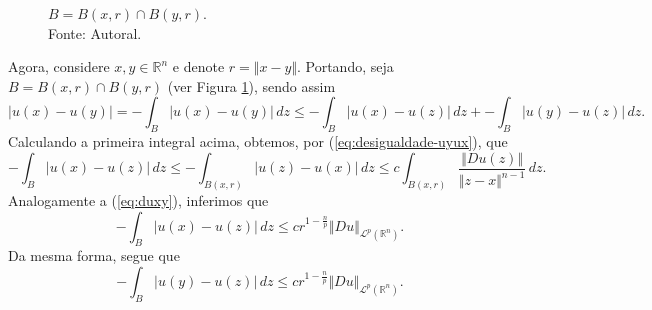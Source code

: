 \documentclass[a4paper, 11pt]{book}
\theoremstyle{definition}
\newcommand{\bR}{\mathbb{R}}
\newcommand{\cL}{\mathcal{L}}
\newcommand{\sint}{-\!\!\!\!\!\!\int}
\begin{document}
\begin{prf}
    \begin{figure}
        \centering
        \caption{$B = B(x,r) \cap B(y,r)$.\\
        Fonte: Autoral.}
        \label{fig:B}
    \end{figure}
    Agora, considere $x, y \in \bR^n$ e denote $r = \Vert x - y \Vert$. Portando, seja $B = B(x,r) \cap B(y,r)$ (ver Figura \ref{fig:B}), sendo assim
    \begin{equation} \label{eq:abcd}
        |u(x) - u(y)| = \sint_{B} |u(x) - u(y)| \,dz \leqslant \sint_{B} |u(x) - u(z)| \,dz + \sint_B |u(y) - u(z)| \,dz.
    \end{equation}
    Calculando a primeira integral acima, obtemos, por (\ref{eq:desigualdade-uyux}), que
    \[
        \sint_B |u(x) - u(z)| \,dz \leqslant \sint_{B(x,r)} |u(z) - u(x)| \,dz \leqslant c \int_{B(x,r)} \frac{\Vert Du(z) \Vert}{\Vert z - x \Vert^{n-1}} \,dz.
    \]
    Analogamente a (\ref{eq:duxy}), inferimos que
    \[
        \sint_B |u(x) - u(z)| \,dz \leqslant cr^{1 - \frac{n}{p}} \Vert Du \Vert_{\cL^p(\bR^n)}.
    \]
    Da mesma forma, segue que
    \[
        \sint_B |u(y) - u(z)| \,dz \leqslant cr^{1 - \frac{n}{p}} \Vert Du \Vert_{\cL^p(\bR^n)}.
    \]


\end{prf}
\end{document}
